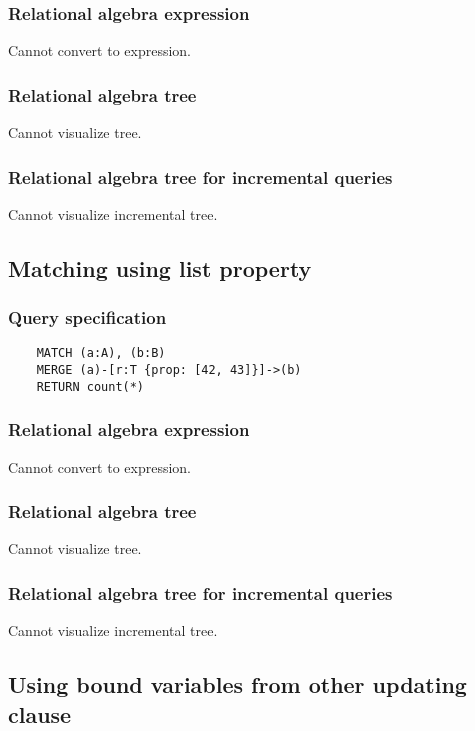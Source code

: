 	\subsubsection*{Relational algebra expression}

	Cannot convert to expression.

	\subsubsection*{Relational algebra tree}

	Cannot visualize tree.

	\subsubsection*{Relational algebra tree for incremental queries}

	Cannot visualize incremental tree.
	\subsection{Matching using list property}

	\subsubsection*{Query specification}

	\begin{lstlisting}
	MATCH (a:A), (b:B)
	MERGE (a)-[r:T {prop: [42, 43]}]->(b)
	RETURN count(*)
	\end{lstlisting}


	\subsubsection*{Relational algebra expression}

	Cannot convert to expression.

	\subsubsection*{Relational algebra tree}

	Cannot visualize tree.

	\subsubsection*{Relational algebra tree for incremental queries}

	Cannot visualize incremental tree.
	\subsection{Using bound variables from other updating clause}

